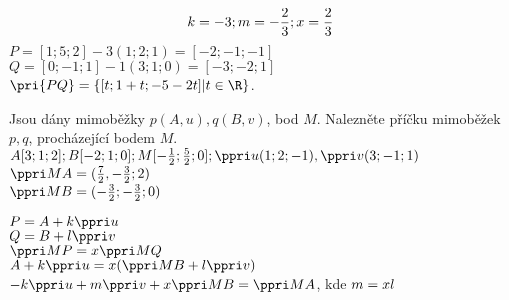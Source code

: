   $$ 
  k = -3 ; m = -\frac 23 ; x = \frac 2 3
    $$ 
    $ P = [1;5;2] - 3(1;2;1) = [-2;-1;-1]$\\
    $ Q = [0;-1;1] - 1(3;1;0) = [-3;-2;1]$\\
    $ \pri{PQ} = \{[t;1+t;-5-2t] | t\in \R \}$.


\Pr Jsou dány mimoběžky $p(A,u), q(B, v)$, bod $M$. Nalezněte příčku mimoběžek $p, q$, procházející bodem $M$.\\
$A[3;1;2];B[-2;1;0];M[-\f 12;\f 52;0];\ve u (1;2;-1),\ve v(3;-1;1)$\\

$\ve{MA} = (\f72,-\f32;2)$\\
$\ve{MB} = (-\f32;-\f32;0)$

$P = A + k \ve u$\\
$Q = B + l \ve v$\\
$\ve{MP} = x \* \ve{MQ}$\\
$A + k \ve u = x (\ve{MB} + l \ve v)$\\
$-k\ve u + m \ve v + x \ve{MB} = \ve{MA}$, kde $m = x\* l$

